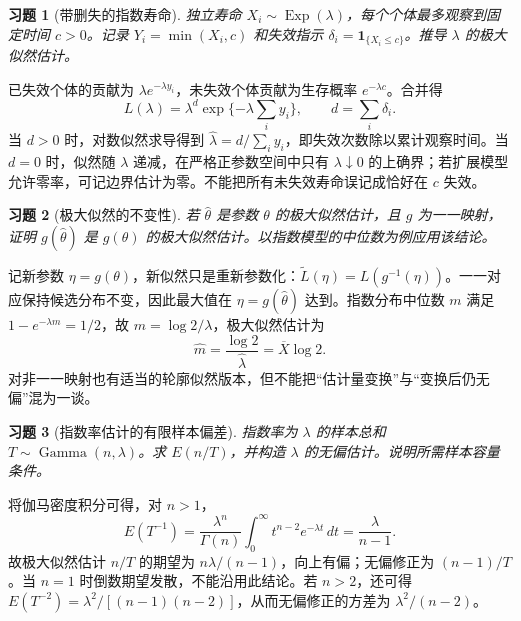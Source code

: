\documentclass[12pt,fontset=fandol]{ctexart}
\newtheorem{exercise}{习题}[section]
\begin{document}
\begin{exercise}[带删失的指数寿命]\label{q:B10.4}
独立寿命 $X_i\sim\operatorname{Exp}(\lambda)$，每个个体最多观察到固定时间 $c>0$。记录 $Y_i=\min(X_i,c)$ 和失效指示 $\delta_i=\mathbf1_{\{X_i\le c\}}$。推导 $\lambda$ 的极大似然估计。\par{}
\end{exercise}

\begin{solve}\label{a:B10.4}已失效个体的贡献为 $\lambda e^{-\lambda y_i}$，未失效个体贡献为生存概率 $e^{-\lambda c}$。合并得\[L(\lambda)=\lambda^d\exp\{-\lambda\sum_i y_i\},\qquad d=\sum_i\delta_i.\]当 $d>0$ 时，对数似然求导得到 $\widehat\lambda=d/\sum_i y_i$，即失效次数除以累计观察时间。当 $d=0$ 时，似然随 $\lambda$ 递减，在严格正参数空间中只有 $\lambda\downarrow0$ 的上确界；若扩展模型允许零率，可记边界估计为零。不能把所有未失效寿命误记成恰好在 $c$ 失效。\end{solve}

\begin{exercise}[极大似然的不变性]\label{q:B10.5}
若 $\widehat\theta$ 是参数 $\theta$ 的极大似然估计，且 $g$ 为一一映射，证明 $g(\widehat\theta)$ 是 $g(\theta)$ 的极大似然估计。以指数模型的中位数为例应用该结论。\par{}
\end{exercise}

\begin{solve}\label{a:B10.5}记新参数 $\eta=g(\theta)$，新似然只是重新参数化：$\widetilde L(\eta)=L(g^{-1}(\eta))$。一一对应保持候选分布不变，因此最大值在 $\eta=g(\widehat\theta)$ 达到。指数分布中位数 $m$ 满足 $1-e^{-\lambda m}=1/2$，故 $m=\log2/\lambda$，极大似然估计为\[\widehat m=\frac{\log2}{\widehat\lambda}=\overline X\log2.\]对非一一映射也有适当的轮廓似然版本，但不能把“估计量变换”与“变换后仍无偏”混为一谈。\end{solve}

\begin{exercise}[指数率估计的有限样本偏差]\label{q:B10.6}
指数率为 $\lambda$ 的样本总和 $T\sim\operatorname{Gamma}(n,\lambda)$。求 $E(n/T)$，并构造 $\lambda$ 的无偏估计。说明所需样本容量条件。\par{}
\end{exercise}

\begin{solve}\label{a:B10.6}将伽马密度积分可得，对 $n>1$，\[E(T^{-1})=\frac{\lambda^n}{\Gamma(n)}\int_0^\infty t^{n-2}e^{-\lambda t}\,dt=\frac{\lambda}{n-1}.\]故极大似然估计 $n/T$ 的期望为 $n\lambda/(n-1)$，向上有偏；无偏修正为 $(n-1)/T$。当 $n=1$ 时倒数期望发散，不能沿用此结论。若 $n>2$，还可得 $E(T^{-2})=\lambda^2/[(n-1)(n-2)]$，从而无偏修正的方差为 $\lambda^2/(n-2)$。\end{solve}
\end{document}

